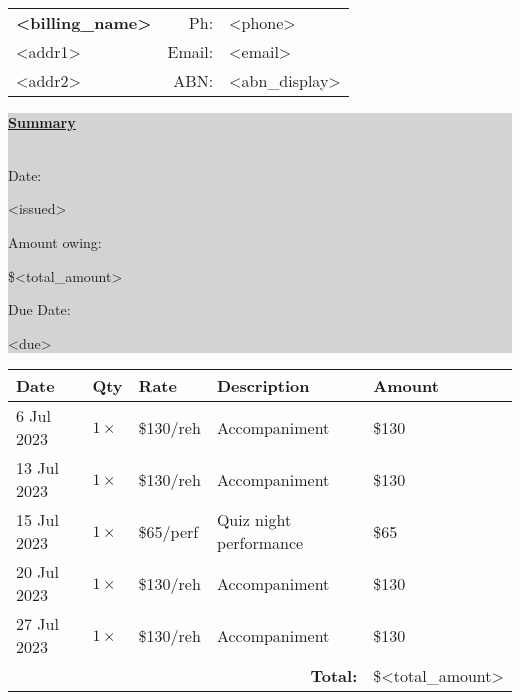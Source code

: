 \documentclass{article}
\begin{document}
\pagestyle{empty}

 \\[20pt]

\begin{table}[!ht]
    \begin{tabular}{lrl}
        {\bf <billing_name>} \hspace{5cm} & Ph:    & <phone> \\
        <addr1>     & Email: & {\color{blue} <email>} \\
        <addr2>    & ABN:   & <abn_display>
    \end{tabular}
\end{table}

\hfill
\colorbox{lightgray}{\parbox{0.3\textwidth}{
    \underline{\bf Summary} \\
    \\
    \parbox{0.15\textwidth}{Date:}         <issued> \\
    \parbox{0.15\textwidth}{Amount owing:} \$<total_amount> \\
    \parbox{0.15\textwidth}{Due Date:}     <due> \\
    }
}

\vspace{1cm}

\begin{table}[!ht]
    \centering
    \begin{tabular}{|l|l|l|l|l|}
        \hline
        \rowcolor{lightgray}
        {\bf Date} \hspace{1cm} & {\bf Qty} \hspace{0.5cm} & {\bf Rate} \hspace{1cm} & {\bf Description} \hspace{5cm} & {\bf Amount} \hspace{0.1cm} \\
        \hline
        6 Jul 2023 & $1\times$ & \$130/reh & Accompaniment & \$130 \\ \hline
        13 Jul 2023 & $1\times$ & \$130/reh & Accompaniment & \$130 \\ \hline
        15 Jul 2023 & $1\times$ & \$65/perf & Quiz night performance & \$65 \\ \hline
        20 Jul 2023 & $1\times$ & \$130/reh & Accompaniment & \$130 \\ \hline
        27 Jul 2023 & $1\times$ & \$130/reh & Accompaniment & \$130 \\ \hline
        \multicolumn{4}{r}{\bf Total:} & \multicolumn{1}{l}{\$<total_amount>}
    \end{tabular}
\end{table}
        
\end{document}
